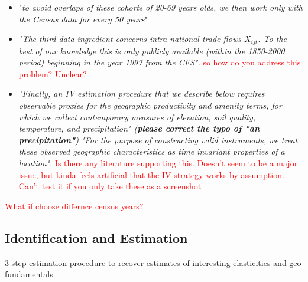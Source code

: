 \documentclass[10pt, final]{article}
\begin{document}
\begin{itemize}
    \item "\textit{to avoid overlaps of these cohorts of 20-69 years olds, we then work only with the Census data for every 50 years}"
    \item \textit{"The third data ingredient concerns intra-national trade flows $X_{ijt}$. To the best of our knowledge this is only publicly available (within the 1850-2000 period) beginning in the year 1997 from the CFS".} \textcolor{red}{so how do you address this problem? Unclear?}
    \item \textit{"Finally, an IV estimation procedure that we describe below requires observable proxies for the geographic productivity and amenity terms, for which we collect contemporary measures of elevation, soil quality, temperature, and precipitation" (\textbf{please correct the typo of "an precipitation"}) "For the purpose of constructing valid instruments, we treat these observed geographic characteristics as time invariant properties of a location"}. \textcolor{red}{Is there any literature supporting this. Doesn't seem to be a major issue, but kinda feels artificial that the IV strategy works by assumption. Can't test it if you only take these as a screenshot}
\end{itemize}
\textcolor{red}{What if choose differnce census years?}

\subsection{Identification and Estimation} %
\label{sub:identification_and_estimation}

3-step estimation procedure to recover estimates of interesting elasticities and geo fundamentals
\end{document}
